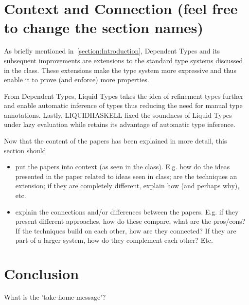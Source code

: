 \documentclass[a4paper,UKenglish]{lipics-v2016}
\begin{document}
\section{Context and Connection (feel free to change the section names)}

  As briefly mentioned in~\ref{section:Introduction}, Dependent Types and its
  subsequent improvements are extensions to the standard type systems discussed
  in the class.  These extensions make the type system more expressive and thus
  enable it to prove (and enforce) more properties.

  From Dependent Types, Liquid Types takes the idea of refinement types further
  and enable automatic inference of types thus reducing the need for manual
  type annotations.  Lastly, LIQUIDHASKELL fixed the soundness of Liquid Types
  under lazy evaluation while retains its advantage of automatic type
  inference.

  Now that the content of the papers has been explained in more detail,
  this section should
  \begin{itemize}
    \item put the papers into context (as seen in the class). E.g. how do the
    ideas presented in the paper related to ideas seen in class; are the techniques
    an extension; if they are completely different, explain how (and perhaps why), etc.

    \item explain the connections and/or differences between the papers.
      E.g. if they present different approaches, how do these compare, what are the pros/cons?
      If the techniques build on each other, how are they connected?
      If they are part of a larger system, how do they complement each other?
      Etc.

  \end{itemize}

\section{Conclusion}

  What is the 'take-home-message'?





\end{document}
